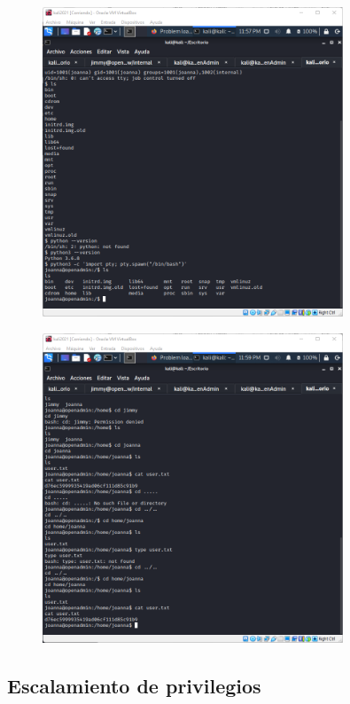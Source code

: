 \documentclass{article}
\begin{document}
\begin{figure}[h]
	\center
	\includegraphics[width=0.8\textwidth]{images/openadmin/17-alternativa2.png}
	\caption{}
\end{figure}

\begin{figure}[h]
	\center
	\includegraphics[width=0.8\textwidth]{images/openadmin/17-alternativa3.png}
	\caption{}
\end{figure}

\subsection{Escalamiento de privilegios}
\end{document}
